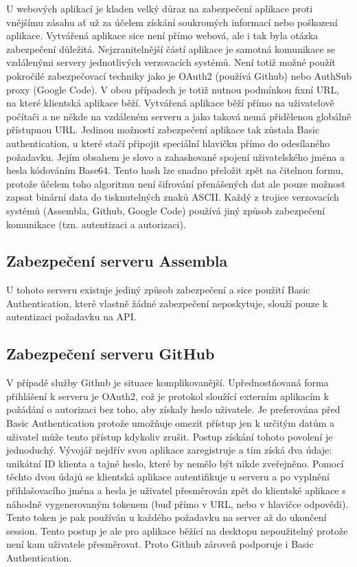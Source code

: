 U webových aplikací je kladen velký důraz na zabezpečení aplikace proti vnějšímu zásahu ať už za účelem získání soukromých informací nebo poškození aplikace. Vytvářená aplikace sice není přímo webová, ale i tak byla otázka zabezpečení důležitá. Nejzranitelnější částí aplikace je samotná komunikace se vzdálenými servery jednotlivých verzovacích systémů. Není totiž možné použít pokročilé zabezpečovací techniky jako je OAuth2 (používá Github) nebo AuthSub proxy (Google Code). V obou případech je totiž nutnou podmínkou fixní URL, na které klientská aplikace běží. Vytvářená aplikace běží přímo na uživatelově počítači a ne někde na vzdáleném serveru a jako taková nemá přidělenou globálně přístupnou URL. Jedinou možností zabezpečení aplikace tak zůstala Basic authentication, u které stačí připojit speciální hlavičku  přímo do odesílaného požadavku. Jejím obsahem je slovo  a zahashované spojení uživatelského jména a hesla kódováním Base64. Tento hash lze snadno přeložit zpět na čitelnou formu, protože účelem toho algoritmu není šifrování přenášených dat ale pouze možnost zapsat binární data do tisknutelných znaků ASCII. Každý z trojice verzovacích systémů (Assembla, Github, Google Code) používá jiný způsob zabezpečení komunikace (tzn. autentizaci a autorizaci). 

\subsection{Zabezpečení serveru Assembla}

U tohoto serveru existuje jediný způsob zabezpečení\cite{assemblaauth} a sice použití Basic Authentication, které vlastně žádné zabezpečení neposkytuje, slouží pouze k autentizaci požadavku na API.

\subsection{Zabezpečení serveru GitHub}

V případě služby Github je situace komplikovanější\cite{github:summary}. Upřednostňovaná forma přihlášení k serveru je OAuth2\cite{github:oauth}, což je protokol sloužící externím aplikacím k požádání o autorizaci bez toho, aby získaly heslo uživatele. Je preferována před Basic Authentication protože umožňuje omezit přístup jen k určitým datům a uživatel může tento přístup kdykoliv zrušit. Postup získání tohoto povolení je jednoduchý. Vývojář nejdřív svou aplikace zaregistruje a tím získá dva údaje: unikátní ID klienta a tajné heslo, které by nemělo být nikde zveřejněno. Pomocí těchto dvou údajů se klientská aplikace autentifikuje u serveru a po vyplnění přihlašovacího jména a hesla je uživatel přesměrován zpět do klientské aplikace s náhodně vygenerovaným tokenem (buď přímo v URL, nebo v hlavičce odpovědi). Tento token je pak používán u každého požadavku na server až do ukončení session. Tento postup je ale pro aplikace běžící na desktopu nepoužitelný protože není kam uživatele přesměrovat. Proto Github zároveň podporuje i Basic Authentication.

